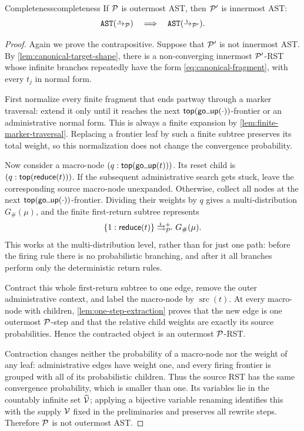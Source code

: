 \begin{Theorem}{Completeness}{completeness}
  If \(\P\) is outermost AST, then \(\P'\) is innermost AST:
  \[
    \AST[\oto_{\P}]\quad\Longrightarrow\quad\AST[\ito_{\P'}].
  \]
\end{Theorem}

\begin{proof}
  Again we prove the contrapositive.  Suppose that \(\P'\) is not innermost
  AST.  By \cref{lem:canonical-target-shape}, there is a non-converging
  innermost \(\P'\)-RST whose infinite branches repeatedly have the form
  \eqref{eq:canonical-fragment}, with every \(t_j\) in normal form.

  First normalize every finite fragment that ends partway through a marker
  traversal: extend it only until it reaches the next
  \(\ttop(\tgoup(\cdot))\)-frontier or an administrative normal form.  This is
  always a finite expansion by \cref{lem:finite-marker-traversal}.  Replacing a
  frontier leaf by such a finite subtree preserves its total weight, so this
  normalization does not change the convergence probability.

  Now consider a macro-node \((q:\ttop(\tgoup(t)))\).  Its reset child is
  \((q:\ttop(\treduce(t)))\).  If the subsequent administrative search gets
  stuck, leave the corresponding source macro-node unexpanded.  Otherwise,
  collect all nodes at the next \(\ttop(\tgoup(\cdot))\)-frontier.  Dividing
  their weights by \(q\) gives a multi-distribution
  \(G_{\#}(\mu)\), and the finite first-return subtree represents
  \[
    \{1:\treduce(t)\}\iliftto_{\P'}^{+}G_{\#}(\mu).
  \]
  This works at the multi-distribution level, rather than for just one path: before
  the firing rule there is no probabilistic branching, and after it all
  branches perform only the deterministic return rules.

  Contract this whole first-return subtree to one edge, remove the outer
  administrative context, and label the macro-node by
  \(\operatorname{src}(t)\).  At every macro-node with children,
  \cref{lem:one-step-extraction} proves that the new edge is one outermost
  \(\P\)-step and that the relative child weights are exactly its source
  probabilities.  Hence the contracted object is an outermost \(\P\)-RST.

  Contraction changes neither the probability of a macro-node nor the weight of
  any leaf: administrative edges have weight one, and every firing frontier is
  grouped with all of its probabilistic children.  Thus the source RST has the
  same convergence probability, which is smaller than one.  Its variables lie
  in the countably infinite set \(\widehat{\Var}\); applying a bijective variable
  renaming identifies this with the supply \(\Var\) fixed in the preliminaries
  and preserves all rewrite steps.  Therefore \(\P\) is not outermost AST.
\end{proof}

